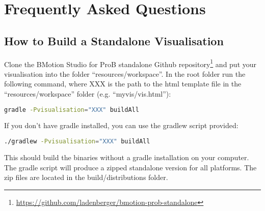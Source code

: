\chapter{Frequently Asked Questions}
\label{faq}

\section{How to Build a Standalone Visualisation}

Clone the BMotion Studio for ProB standalone Github repository\footnote{\url{https://github.com/ladenberger/bmotion-prob-standalone}} and put your visualisation into the folder ``resources/workspace''.
In the root folder run the following command, where XXX is the path to the html template file in the ``resources/workspace'' folder (e.g. ``myvis/vis.html''):
\begin{lstlisting}[language=bash]
gradle -Pvisualisation="XXX" buildAll
\end{lstlisting}

If you don't have gradle installed, you can use the gradlew script provided:
\begin{lstlisting}[language=bash]
./gradlew -Pvisualisation="XXX" buildAll
\end{lstlisting}

This should build the binaries without a gradle installation on your computer.
The gradle script will produce a zipped standalone version for all platforms. The zip files are located in the build/distributions folder.




